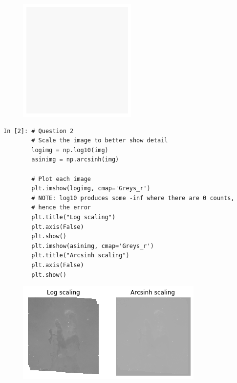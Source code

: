 \begin{figure}[H]
	\centering
	\includegraphics[scale=1.2]{Pictures/rawimg.png}
\end{figure}

\newpage

\begin{lstlisting}[style=PY]
In [2]: # Question 2
        # Scale the image to better show detail
        logimg = np.log10(img)
        asinimg = np.arcsinh(img)
        
        # Plot each image
        plt.imshow(logimg, cmap='Greys_r')
        # NOTE: log10 produces some -inf where there are 0 counts, 
        # hence the error
        plt.title("Log scaling")
        plt.axis(False)
        plt.show()
        plt.imshow(asinimg, cmap='Greys_r')
        plt.title("Arcsinh scaling")
        plt.axis(False)
        plt.show()
\end{lstlisting}

\begin{figure}[H]
	\centering
	\includegraphics[width=\linewidth]{Pictures/logasinimg.png}
\end{figure}

\newpage


